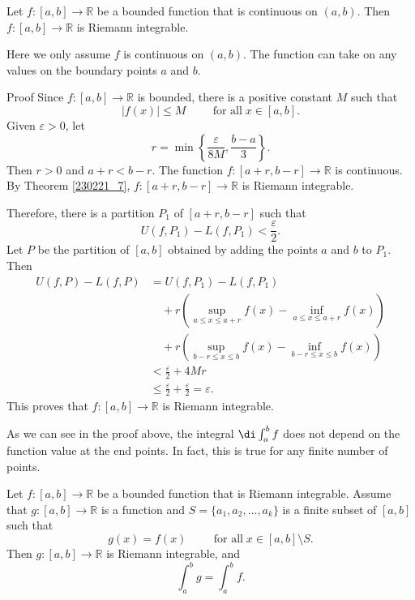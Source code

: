 \begin{theorem}[label=230221_8]{}
Let $f:[a,b]\to\mathbb{R}$ be a bounded  function that is continuous on $(a, b)$. Then $f:[a,b]\to\mathbb{R}$ is Riemann integrable.
\end{theorem}
Here we only assume $f$ is continuous on $(a,b)$. The function can take on any values on the boundary points $a$ and $b$.
\begin{myproof}{Proof}
Since  $f:[a,b]\to\mathbb{R}$ is bounded, there is a positive constant $M$ such that
\[|f(x)|\leq M\hspace{1cm}\text{for all}\;x\in [a,b].\]
Given $\varepsilon>0$, let 
\[r=\min\left\{\frac{\varepsilon}{8M}, \frac{b-a}{3}\right\}.\]Then $r>0$ and $a+r<b-r$. The function $f:[a+r, b-r]\to\mathbb{R}$ is continuous.  By Theorem \ref{230221_7}, $f:[a+r, b-r]\to\mathbb{R}$ is Riemann integrable.

 Therefore, there is a partition $P_1$ of $[a+r, b-r]$ such that
\[U(f,P_1)-L(f,P_1)<\frac{\varepsilon}{2}.\]
Let $P$ be the partition of $[a,b]$ obtained by adding the points $a$ and $b$ to $P_1$.  Then
\begin{align*}U(f,P)-L(f,P)&=U(f,P_1)-L(f,P_1)\\&\quad +r\left(\sup_{a\leq x\leq a+r}f(x)-\inf_{a\leq x\leq a+r}f(x)\right)\\&\quad +r\left(\sup_{b-r\leq x\leq b}f(x)-\inf_{b-r\leq x\leq b}f(x)\right)\\
&<\frac{\varepsilon}{2}+4Mr\\
&\leq \frac{\varepsilon}{2}+\frac{\varepsilon}{2}=\varepsilon.\end{align*}
This proves that $f:[a,b]\to\mathbb{R}$ is Riemann integrable.

\end{myproof}

As we can see in the proof above, the integral $\di\int_a^b f$ does not depend on the function value at the end points. In fact, this is true for  any finite number of points.
\begin{theorem}[label=230222_2]{}
Let $f:[a,b]\to\mathbb{R}$  be a bounded function that is Riemann integrable. Assume that $g:[a,b]\to\mathbb{R}$ is a function  and $S=\{ a_1, a_2, \ldots, a_k\}$ is a finite subset of $[a,b]$ such that
\[g(x)=f(x)\hspace{1cm}\text{for all}\; x\in [a,b]\setminus S.\]
Then  $g:[a,b]\to\mathbb{R}$ is Riemann integrable, and
\[\int_a^b g=\int_a^b f.\]
\end{theorem}

